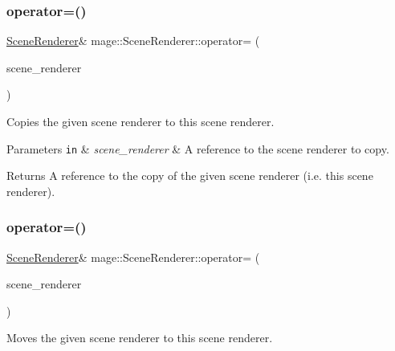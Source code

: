 \subsubsection{\texorpdfstring{operator=()}{operator=()}\hspace{0.1cm}{\footnotesize\ttfamily [1/2]}}
{\footnotesize\ttfamily \hyperlink{classmage_1_1_scene_renderer}{Scene\+Renderer}\& mage\+::\+Scene\+Renderer\+::operator= (\begin{DoxyParamCaption}\item[{const \hyperlink{classmage_1_1_scene_renderer}{Scene\+Renderer} \&}]{scene\+\_\+renderer }\end{DoxyParamCaption})\hspace{0.3cm}{\ttfamily [delete]}}

Copies the given scene renderer to this scene renderer.


\begin{DoxyParams}[1]{Parameters}
\mbox{\tt in}  & {\em scene\+\_\+renderer} & A reference to the scene renderer to copy. \\
\hline
\end{DoxyParams}
\begin{DoxyReturn}{Returns}
A reference to the copy of the given scene renderer (i.\+e. this scene renderer). 
\end{DoxyReturn}
\hypertarget{classmage_1_1_scene_renderer_af64b01e57b0367a285f48e1f34f291e3}{}\label{classmage_1_1_scene_renderer_af64b01e57b0367a285f48e1f34f291e3} 
\subsubsection{\texorpdfstring{operator=()}{operator=()}\hspace{0.1cm}{\footnotesize\ttfamily [2/2]}}
{\footnotesize\ttfamily \hyperlink{classmage_1_1_scene_renderer}{Scene\+Renderer}\& mage\+::\+Scene\+Renderer\+::operator= (\begin{DoxyParamCaption}\item[{\hyperlink{classmage_1_1_scene_renderer}{Scene\+Renderer} \&\&}]{scene\+\_\+renderer }\end{DoxyParamCaption})\hspace{0.3cm}{\ttfamily [delete]}}

Moves the given scene renderer to this scene renderer.


